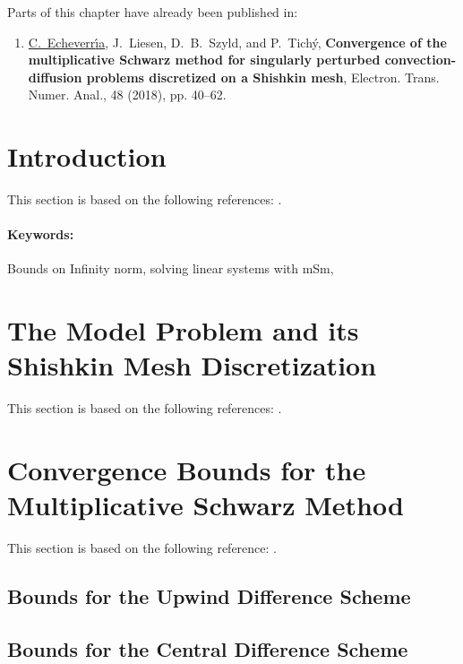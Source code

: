 \ifnum{}
Parts of this chapter have already been published in:
\begin{enumerate}
\item[\cite{EchLieSzyTic18}] \underline{C.~Echeverr{\'\i}a}, J.~Liesen, D.~B.~Szyld, and P.~Tich{\'y}, \textbf{Convergence of the multiplicative Schwarz method for singularly perturbed convection-diffusion problems discretized on a Shishkin mesh}, Electron. Trans. Numer. Anal., 48 (2018), pp. 40--62.
\end{enumerate}


\section{Introduction}
This section is based on the following references: \cite{EchLieSzyTic18, GriDolSil15}.
\paragraph{Keywords:} Bounds on Infinity norm, solving linear systems with mSm,


\section{The Model Problem and its Shishkin Mesh Discretization}
This section is based on the following references: \cite{GriDolSil15, Lin10, RooStyTob08, Sty05}.


\section{Convergence Bounds for the Multiplicative Schwarz Method}
This section is based on the following reference: \cite{EchLieSzyTic18}.


\subsection{Bounds for the Upwind Difference Scheme}


\subsection{Bounds for the Central Difference Scheme}


